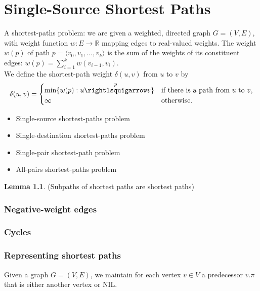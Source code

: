 \documentclass[letter]{book}
\theoremstyle{definition}
\newtheorem{lemma}[theorem]{Lemma}
\theoremstyle{definition}
\theoremstyle{remark}
\begin{document}
\setcounter{chapter}{23}

\chapter{Single-Source Shortest Paths}
A shortest-paths problem: we are given a weighted, directed graph $G=(V,E)$, with weight function $w:E\rightarrow\mathbb{R}$ mapping edges to real-valued weights. The weight $w(p)$ of path $p=\langle v_0,v_1,\ldots, v_k\rangle$ is the sum of the weights of its constituent edges: $w(p)=\sum_{i=1}^{k}{w(v_{i-1},v_i)}$.\\
We define the shortest-path weight $\delta(u,v)$ from $u$ to $v$ by
\begin{equation*}
    \delta(u,v)=
    \begin{cases}
        \min\{w(p):u\overset{p}{\rightlsquigarrow}v\}  & \text{if there is a path from $u$ to $v$,} \\
        \infty & \text{otherwise.}
    \end{cases}
\end{equation*}
\begin{itemize}
    \item Single-source shortest-paths problem
    \item Single-destination shortest-paths problem
    \item Single-pair shortest-path problem
    \item All-pairs shortest-paths problem
\end{itemize}
\bigskip
\begin{lemma} (Subpaths of shortest paths are shortest paths)
\end{lemma}

\subsection*{Negative-weight edges}

\subsection*{Cycles}

\subsection*{Representing shortest paths}
Given a graph $G=(V,E)$, we maintain for each vertex $v\in V$ a predecessor $v.\pi$ that is either another vertex or NIL.
\end{document}
